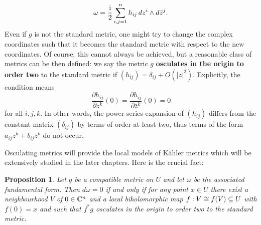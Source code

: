 \documentclass[11pt]{book}
\newtheorem{proposition}[theorem]{Proposition}
\theoremstyle{definition}
\begin{document}
\begin{align}\label{complex manifold fundamental on C^n express}
\omega=\frac{\mathrm{i}}{2}\sum_{i,j=1}^{n}h_{ij}\,dz^i\wedge d\bar{z}^j.
\end{align}
Even if $g$ is not the standard metric, one might try to change the complex coordinates such that it becomes the standard metric with respect to the new coordinates. Of course, this cannot always be achieved, but a reasonable class of metrics can be then defined: we say the metric $g$ \textbf{osculates in the origin to order two} to the standard metric if $(h_{ij})=\delta_{ij}+O(|z|^2)$. Explicitly, the condition means 
\[\frac{\partial h_{ij}}{\partial z^k}(0)=\frac{\partial h_{ij}}{\partial\bar{z}^k}(0)=0\]
for all $i,j,k$. In other words, the power series expansion of $(h_{ij})$ differs from the constant matrix $(\delta_{ij})$ by terms of order at least two, thus terms of the form $a_{ij}z^k+b_{ij}\bar{z}^k$ do not occur.\par
Osculating metrics will provide the local models of K\"ahler metrics which will be extensively studied in the later chapters. Here is the crucial fact:
\begin{proposition}\label{complex manifold metric on C^n Kahler iff two order}
Let $g$ be a compatible metric on $U$ and let $\omega$ be the associated fundamental form. Then $d\omega=0$ if and only if for any point $x\in U$ there exist a neighbourhood $V$ of $0\in\mathbb{C}^n$ and a local biholomorphic map $f:V\cong f(V)\subseteq U$ with $f(0) =x$ and such that $f^*g$ osculates in the origin to order two to the standard metric.
\end{proposition}
\end{document}
